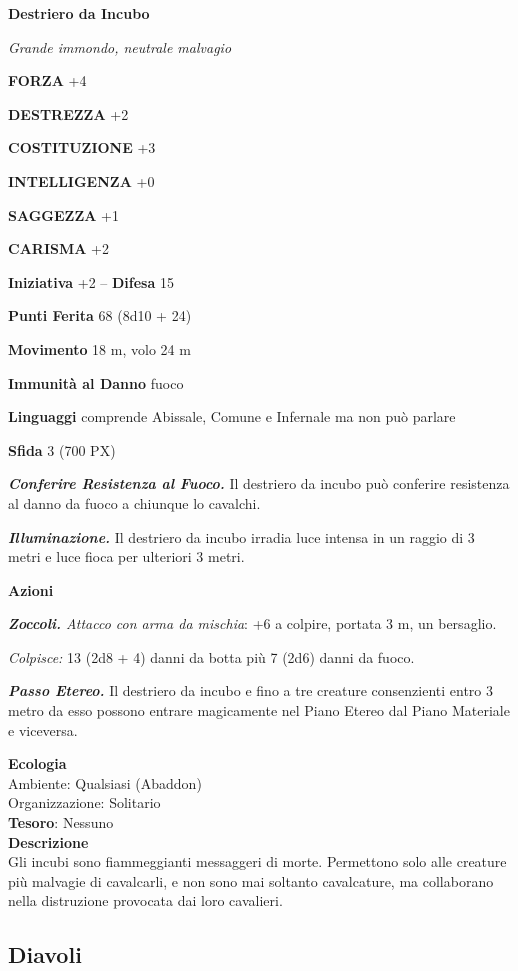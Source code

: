 \begin{multicols}{2}
	\medskip{}\textbf{Destriero da Incubo}

	\textit{Grande immondo, neutrale malvagio}

	\textbf{FORZA} +4

	\textbf{DESTREZZA} +2

	\textbf{COSTITUZIONE} +3

	\textbf{INTELLIGENZA} +0

	\textbf{SAGGEZZA} +1

	\textbf{CARISMA} +2

	\textbf{Iniziativa} +2 -- \textbf{Difesa} 15

	\textbf{Punti Ferita} 68 (8d10 + 24)

	\textbf{Movimento} 18 m, volo 24 m

	\textbf{Immunità al Danno} fuoco

	\textbf{Linguaggi} comprende Abissale, Comune e Infernale ma non può parlare

	\textbf{Sfida} 3 (700 PX)

	\textit{\textbf{Conferire Resistenza al Fuoco.}} Il destriero da incubo può conferire resistenza al danno da fuoco a chiunque lo cavalchi.

	\textit{\textbf{Illuminazione.}} Il destriero da incubo irradia luce intensa in un raggio di 3 metri e luce fioca per ulteriori 3 metri.

	\textbf{Azioni}

	\textit{\textbf{Zoccoli.} Attacco con arma da mischia}: +6 a colpire, portata 3 m, un bersaglio.

	\textit{Colpisce:} 13 (2d8 + 4) danni da botta più 7 (2d6) danni da fuoco.

	\textit{\textbf{Passo Etereo.}} Il destriero da incubo e fino a tre creature consenzienti entro 3 metro da esso possono entrare magicamente nel Piano Etereo dal Piano Materiale e viceversa.

	\textbf{Ecologia}\\
	Ambiente: Qualsiasi (Abaddon)\\
	Organizzazione: Solitario\\
	\textbf{Tesoro}: Nessuno\\
	\textbf{Descrizione}\\
	Gli incubi sono fiammeggianti messaggeri di morte. Permettono solo alle creature più malvagie di cavalcarli, e non sono mai soltanto cavalcature, ma collaborano nella distruzione provocata dai loro cavalieri.

	\subsection{Diavoli}


\end{multicols}
